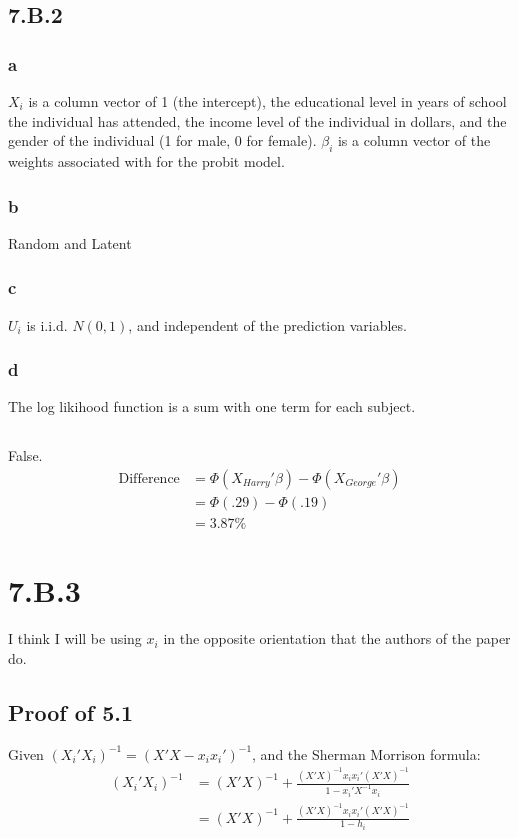 \documentclass{article}\usepackage[]{graphicx}\usepackage[]{color}
\begin{document}
\subsection*{7.B.2}
\subsubsection*{a}
\(X_i\) is a column vector of 1 (the intercept), the educational level in years
of school the individual has attended, the income level of the individual in dollars,
and the gender of the individual (1 for male, 0 for female).  \(\beta_i\) is a column
vector of the weights associated with for the probit model.
\subsubsection*{b}
Random and Latent
\subsubsection*{c}
\(U_i\) is i.i.d. \(N(0, 1)\), and independent of the prediction variables.
\subsubsection*{d}
The log likihood function is a sum with one term for each subject.
\subsection{}
False.
\begin{align*}
\text{Difference} &= \Phi(X_{Harry}'\beta) - \Phi(X_{George}'\beta)\\
&= \Phi(.29) - \Phi(.19)\\
&= 3.87\%
\end{align*}
\section*{7.B.3}
I think I will be using \(x_i\) in the opposite orientation that the authors of the paper do.
\subsection*{Proof of 5.1}
Given \( (X_i' X_i)^{-1} = (X'X - x_i x_i')^{-1} \), and the Sherman Morrison
formula:
\begin{align*}
(X_i' X_i)^{-1} &= (X' X)^{-1} + \frac{(X' X)^{-1} x_i x_i' (X' X)^{-1}}{1 - x_i' X^{-1} x_i}\\
&= (X' X)^{-1} + \frac{(X' X)^{-1} x_i x_i' (X' X)^{-1}}{1 - h_i}
\end{align*}
\end{document}
